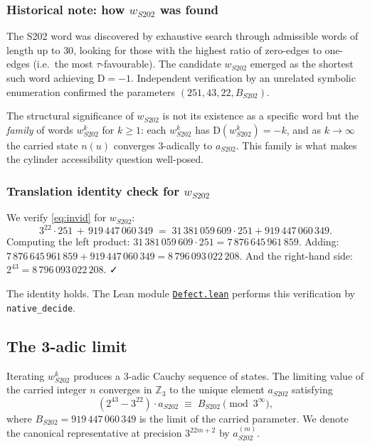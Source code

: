 \documentclass[11pt,a4paper]{article}
\theoremstyle{plain}
\theoremstyle{definition}
\newcommand{\Zp}[1]{\mathbb{Z}_{#1}}
\newcommand{\aS}{a_{S202}}
\newcommand{\aSat}{a_{S202}^{(m)}}
\newcommand{\wS}{w_{S202}}
\newcommand{\defect}{\mathrm{D}}
\begin{document}
\subsubsection*{Historical note: how $\wS$ was found}

The S202 word was discovered by exhaustive search through admissible
words of length up to $30$, looking for those with the highest ratio
of zero-edges to one-edges (i.e.\ the most $\tau$-favourable). The
candidate $\wS$ emerged as the shortest such word achieving
$\defect = -1$. Independent verification by an unrelated symbolic
enumeration confirmed the parameters $(251, 43, 22, B_{S202})$.

The structural significance of $\wS$ is not its existence as a
specific word but the \emph{family} of words $\wS^k$ for $k \ge 1$:
each $\wS^k$ has $\defect(\wS^k) = -k$, and as $k \to \infty$ the
carried state $n(u)$ converges 3-adically to $\aS$. This family is
what makes the cylinder accessibility question well-posed.

\subsubsection*{Translation identity check for $\wS$}

We verify \eqref{eq:invid} for $\wS$:
\[
   3^{22} \cdot 251 \,+\, 919\,447\,060\,349
   \;=\; 31\,381\,059\,609 \cdot 251 + 919\,447\,060\,349.
\]
Computing the left product:
$31\,381\,059\,609 \cdot 251 = 7\,876\,645\,961\,859$. Adding:
$7\,876\,645\,961\,859 + 919\,447\,060\,349 = 8\,796\,093\,022\,208$.
And the right-hand side: $2^{43} = 8\,796\,093\,022\,208$. ✓

The identity holds. The Lean module
\href{run:CollatzLean4/CollatzLean4/Defect.lean}%
{\texttt{Defect.lean}}
performs this verification by \texttt{native\_decide}.

\subsection{The 3-adic limit}

Iterating $\wS^k$ produces a 3-adic Cauchy sequence of states. The
limiting value of the carried integer $n$ converges in $\Zp{3}$ to
the unique element $\aS$ satisfying
\[
  (2^{43} - 3^{22}) \cdot \aS \;\equiv\; B_{S202} \pmod{3^\infty},
\]
where $B_{S202} = 919\,447\,060\,349$ is the limit of the carried
parameter. We denote the canonical representative at precision
$3^{22m + 2}$ by $\aSat$.
\end{document}
